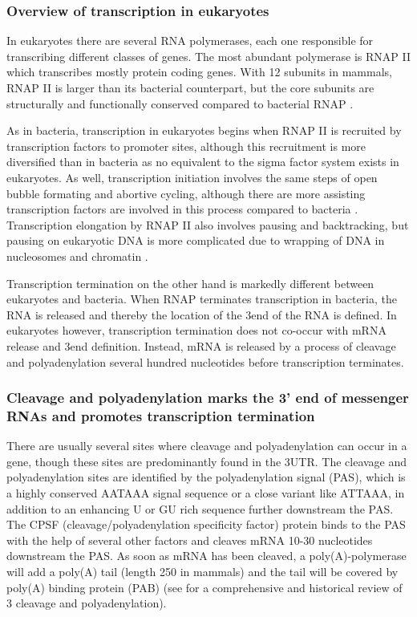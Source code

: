 %
\subsubsection{Overview of transcription in eukaryotes}
In eukaryotes there are several RNA polymerases, each one responsible for
transcribing different classes of genes. The most abundant polymerase is 
RNAP II which transcribes mostly protein coding genes. With 12 subunits in
mammals, RNAP II is larger than its bacterial counterpart, but the core
subunits are structurally and functionally conserved compared to bacterial RNAP
\cite{ebright_rna_2000}.

As in bacteria, transcription in eukaryotes begins when RNAP II is recruited by
transcription factors to promoter sites, although this recruitment is more
diversified than in bacteria as no equivalent to the sigma factor system
exists in eukaryotes. As well, transcription initiation involves the same steps
of open bubble formating and abortive cycling, although there are more
assisting transcription factors are involved in this process compared to
bacteria \cite{wade_transition_2008}. Transcription elongation by RNAP II also
involves pausing and backtracking, but pausing on eukaryotic DNA is more
complicated due to wrapping of DNA in nucleosomes and chromatin
\cite{sims_elongation_2004}.

Transcription termination on the other hand is markedly different between
eukaryotes and bacteria. When RNAP terminates transcription in bacteria, the
RNA is released and thereby the location of the 3\p end of the RNA is defined.
In eukaryotes however, transcription termination does not co-occur with mRNA
release and 3\p end definition. Instead, mRNA is released by a process of
cleavage and polyadenylation several hundred nucleotides before transcription
terminates.

\subsubsection{Cleavage and polyadenylation marks the 3' end of messenger RNAs
and promotes transcription termination}
There are usually several sites where cleavage and polyadenylation can occur in
a gene, though these sites are predominantly found in the 3\p UTR. The cleavage
and polyadenylation sites are identified by the polyadenylation signal (PAS),
which is a highly conserved AATAAA signal sequence or a close variant like
ATTAAA, in addition to an enhancing U or GU rich sequence further downstream
the PAS. The CPSF (cleavage/polyadenylation specificity factor) protein binds
to the PAS with the help of several other factors and cleaves mRNA 10-30
nucleotides downstream the PAS. As soon as mRNA has been cleaved, a
poly(A)-polymerase will add a poly(A) tail (length 250 in mammals) and the tail
will be covered by poly(A) binding protein (PAB) (see
\cite{proudfoot_ending_2011} for a comprehensive and historical review of 3\p
cleavage and polyadenylation).

